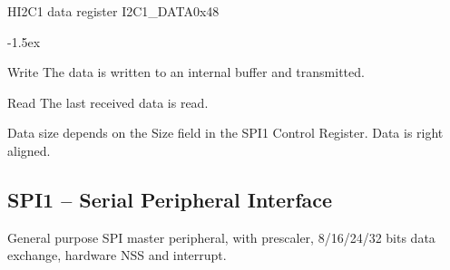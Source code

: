 \documentclass[12pt]{article}
\begin{document}
\begin{register}{H}{I2C1 data register I2C1\_DATA}{0x48}
\label{i2c11data}
%
\regnewline%
\end{register}
\begin{regdesc}[0.8\textwidth]\begin{reglist}[000000000]
\itemsep-1.5ex
\item[Write] The data is written to an internal buffer and transmitted.
\item[Read] The last received data is read.
\end{reglist}\end{regdesc}
Data size depends on the Size field in the SPI1 Control Register. Data is right aligned.


\subsection{SPI1 -- Serial Peripheral Interface}
General purpose SPI master peripheral, with prescaler, 8/16/24/32 bits data exchange, hardware NSS and interrupt.
\end{document}
